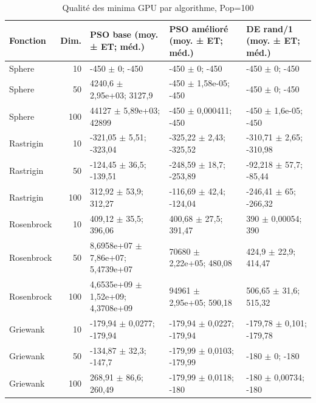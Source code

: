\begin{table}[t]
\centering
\caption{Qualité des minima GPU par algorithme, Pop=100}
\label{tab:qualite-pop100}
\scriptsize
\begin{tabular}{lrp{3.5cm}p{3.5cm}p{3.5cm}}
\toprule
Fonction & Dim. & PSO base (moy. ± ET; méd.) & PSO amélioré (moy. ± ET; méd.) & DE rand/1 (moy. ± ET; méd.) \\
\midrule
Sphere & 10 & -450 $\pm$ 0; -450 & -450 $\pm$ 0; -450 & -450 $\pm$ 0; -450 \\
Sphere & 50 & 4240,6 $\pm$ 2,95e+03; 3127,9 & -450 $\pm$ 1,58e-05; -450 & -450 $\pm$ 0; -450 \\
Sphere & 100 & 44127 $\pm$ 5,89e+03; 42899 & -450 $\pm$ 0,000411; -450 & -450 $\pm$ 1,6e-05; -450 \\
Rastrigin & 10 & -321,05 $\pm$ 5,51; -323,04 & -325,22 $\pm$ 2,43; -325,52 & -310,71 $\pm$ 2,65; -310,98 \\
Rastrigin & 50 & -124,45 $\pm$ 36,5; -139,51 & -248,59 $\pm$ 18,7; -253,89 & -92,218 $\pm$ 57,7; -85,44 \\
Rastrigin & 100 & 312,92 $\pm$ 53,9; 312,27 & -116,69 $\pm$ 42,4; -124,04 & -246,41 $\pm$ 65; -266,32 \\
Rosenbrock & 10 & 409,12 $\pm$ 35,5; 396,06 & 400,68 $\pm$ 27,5; 391,47 & 390 $\pm$ 0,00054; 390 \\
Rosenbrock & 50 & 8,6958e+07 $\pm$ 7,86e+07; 5,4739e+07 & 70680 $\pm$ 2,22e+05; 480,08 & 424,9 $\pm$ 22,9; 414,47 \\
Rosenbrock & 100 & 4,6535e+09 $\pm$ 1,52e+09; 4,3708e+09 & 94961 $\pm$ 2,95e+05; 590,18 & 506,65 $\pm$ 31,6; 515,32 \\
Griewank & 10 & -179,94 $\pm$ 0,0277; -179,94 & -179,94 $\pm$ 0,0227; -179,94 & -179,78 $\pm$ 0,101; -179,78 \\
Griewank & 50 & -134,87 $\pm$ 32,3; -147,7 & -179,99 $\pm$ 0,0103; -179,99 & -180 $\pm$ 0; -180 \\
Griewank & 100 & 268,91 $\pm$ 86,6; 260,49 & -179,99 $\pm$ 0,0118; -180 & -180 $\pm$ 0,00734; -180 \\
\bottomrule
\end{tabular}
\end{table}
